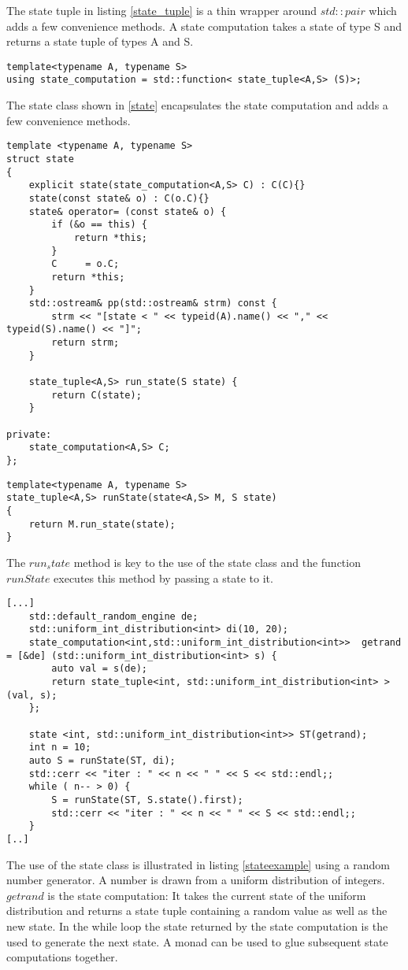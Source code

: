 \documentclass[12pt,fleqn]{article}
\begin{document}
The state tuple in listing \ref{state_tuple} is a thin wrapper around $std::pair$ which adds a few convenience methods.
A state computation takes a state of type S and returns a state tuple of types A and S.
\begin{lstlisting}[caption=state computation albel=state_comp]
template<typename A, typename S>
using state_computation = std::function< state_tuple<A,S> (S)>;
\end{lstlisting}
The state class shown in \ref{state} encapsulates the state computation and adds a few convenience methods.
\begin{lstlisting}[caption=state, label=state]
template <typename A, typename S>
struct state 
{
	explicit state(state_computation<A,S> C) : C(C){}
	state(const state& o) : C(o.C){}
	state& operator= (const state& o) {
		if (&o == this) {
			return *this;
		}
		C     = o.C;
		return *this;
	} 
	std::ostream& pp(std::ostream& strm) const {
		strm << "[state < " << typeid(A).name() << "," << typeid(S).name() << "]";
		return strm;
	}

	state_tuple<A,S> run_state(S state) {
		return C(state);
	}
	
private:
	state_computation<A,S> C;
};
\end{lstlisting}
\begin{lstlisting}[caption=runState, label=runstate]
template<typename A, typename S>
state_tuple<A,S> runState(state<A,S> M, S state)
{
	return M.run_state(state);
}
\end{lstlisting}
The $run_state$ method is key to the use of the state class and the function $runState$ executes this method by passing a state to it.
\begin{lstlisting}[caption=example of the use of the state class, label=stateexample]
[...]
	std::default_random_engine de;
	std::uniform_int_distribution<int> di(10, 20);
	state_computation<int,std::uniform_int_distribution<int>>  getrand = [&de] (std::uniform_int_distribution<int> s) {
		auto val = s(de);
		return state_tuple<int, std::uniform_int_distribution<int> >(val, s);
	}; 

	state <int, std::uniform_int_distribution<int>> ST(getrand);
	int n = 10;
	auto S = runState(ST, di);
	std::cerr << "iter : " << n << " " << S << std::endl;;
	while ( n-- > 0) {
		S = runState(ST, S.state().first);
		std::cerr << "iter : " << n << " " << S << std::endl;;
	}
[..]
\end{lstlisting}
The use of the state class is illustrated in listing \ref{stateexample} using a random number generator.
A number is drawn from a uniform distribution of integers.
$getrand$ is the state computation: It takes the current state of the uniform distribution and returns a state tuple containing a 
random value as well as the new state.
In the while loop the state returned by the state computation is the used to generate the next state. 
A monad can be used to glue subsequent state computations together. 
\end{document}
